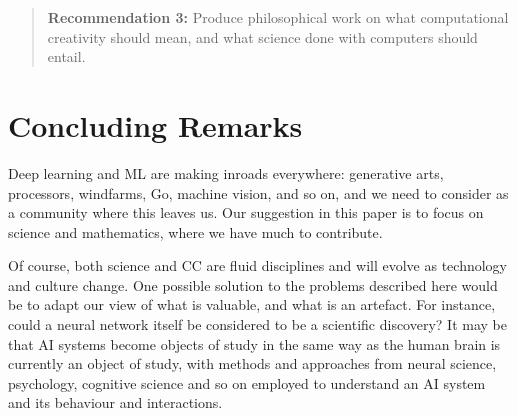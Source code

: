 \documentclass[letterpaper]{article}
\begin{document}
\begin{quote}

  {\bf Recommendation 3:} Produce philosophical work on what
  computational creativity should mean, and what science done with
  computers should entail.

\end{quote}

\section{Concluding Remarks}

Deep learning and ML are making inroads everywhere: generative arts,
processors, windfarms, Go, machine vision, and so on, and we need to
consider as a community where this leaves us. Our suggestion in this
paper is to focus on science and mathematics, where we have much to
contribute.


Of course, both science and CC are fluid disciplines and will evolve
as technology and culture change. One possible solution to the
problems described here would be to adapt our view of what is
valuable, and what is an artefact. For instance, could a neural
network itself be considered to be a scientific discovery?  It may be
that AI systems become objects of study in the same way as the human
brain is currently an object of study, with methods and approaches
from neural science, psychology, cognitive science and so on employed
to understand an AI system and its behaviour and interactions.
\end{document}

